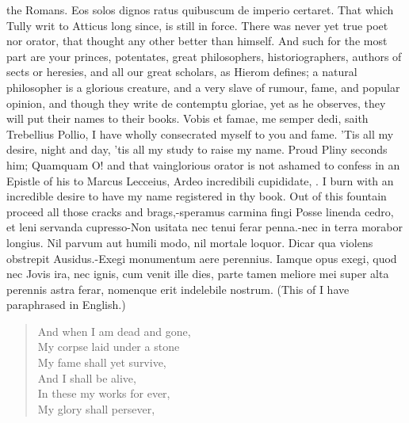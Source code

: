 {the Romans. Eos solos dignos ratus quibuscum de imperio certaret.
That which Tully writ to Atticus long since, is still in force.
There was never yet true poet nor orator, that thought any other
better than himself. And such for the most part are your princes,
potentates, great philosophers, historiographers, authors of sects or
heresies, and all our great scholars, as Hierom defines; a
natural philosopher is a glorious creature, and a very slave of rumour,
fame, and popular opinion, and though they write de contemptu gloriae,
yet as he observes, they will put their names to their books. Vobis et
famae, me semper dedi, saith Trebellius Pollio, I have wholly
consecrated myself to you and fame. 'Tis all my desire, night and day,
'tis all my study to raise my name. Proud Pliny seconds him;
Quamquam O! \etc{} and that vainglorious orator is not ashamed to
confess in an Epistle of his to Marcus Lecceius, Ardeo incredibili
cupididate, \etc{}. I burn with an incredible desire to have my name
registered in thy book. Out of this fountain proceed all those cracks
and brags,-speramus carmina fingi Posse linenda cedro, et leni
servanda cupresso-Non usitata nec tenui ferar penna.-nec in terra
morabor longius. Nil parvum aut humili modo, nil mortale loquor. Dicar
qua violens obstrepit Ausidus.-Exegi monumentum aere perennius. Iamque
opus exegi, quod nec Jovis ira, nec ignis, \etc{} cum venit ille dies, \etc{}
parte tamen meliore mei super alta perennis astra ferar, nomenque erit
indelebile nostrum. (This of \Ovid I have paraphrased in English.)

\begin{verse}
And when I am dead and gone,\\
My corpse laid under a stone\\
My fame shall yet survive,\\
And I shall be alive,\\
In these my works for ever,\\
My glory shall persever, \etc{}
\end{verse}

}
